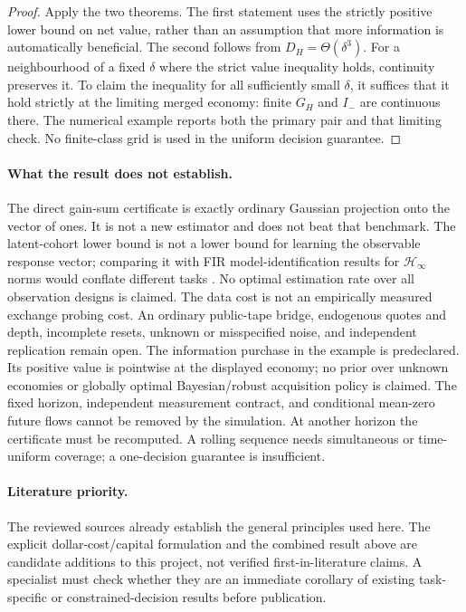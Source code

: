 \documentclass[12pt]{article}
\theoremstyle{definition}
\theoremstyle{remark}
\begin{document}
\begin{proof}
Apply the two theorems. The first statement uses the strictly positive
lower bound on net value, rather than an assumption that more information
is automatically beneficial. The second follows from $D_H=\Theta(\delta^3)$.
For a neighbourhood of a fixed $\delta$ where the strict value inequality
holds, continuity preserves it. To claim the inequality for all sufficiently
small $\delta$, it suffices that it hold strictly at the limiting merged
economy: finite $G_H$ and $I_-$ are continuous there. The numerical example
reports both the primary pair and that limiting check. No finite-class grid
is used in the uniform decision guarantee.
\end{proof}

\paragraph{What the result does not establish.}
The direct gain-sum certificate is exactly ordinary Gaussian projection onto
the vector of ones. It is not a new estimator and does not beat that benchmark.
The latent-cohort lower bound is not a lower bound for learning the observable
response vector; comparing it with FIR model-identification results for
$\mathcal H_\infty$ norms would conflate different tasks \citep{fhc:tu}.
No optimal estimation rate over all observation designs is claimed.
The data cost is not an empirically measured exchange probing cost.
An ordinary public-tape bridge, endogenous quotes and depth, incomplete resets,
unknown or misspecified noise, and independent replication remain open.
The information purchase in the example is predeclared. Its positive value
is pointwise at the displayed economy; no prior over unknown economies or
globally optimal Bayesian/robust acquisition policy is claimed.
The fixed horizon, independent measurement contract, and conditional mean-zero
future flows cannot be removed by the simulation. At another horizon the
certificate must be recomputed. A rolling sequence needs simultaneous or
time-uniform coverage; a one-decision guarantee is insufficient.

\paragraph{Literature priority.}
The reviewed sources already establish the general principles used here.
The explicit dollar-cost/capital formulation and the combined result above
are candidate additions to this project, not verified first-in-literature
claims. A specialist must check whether they are an immediate corollary of
existing task-specific or constrained-decision results before publication.
\end{document}
